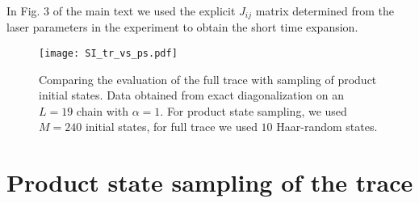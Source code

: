 \documentclass[aps,10pt,reprint,groupedaddress,superscriptaddress]{revtex4-2}
\begin{document}
In Fig. 3 of the main text we used the explicit $J_{ij}$ matrix determined from the laser parameters in the experiment to obtain the short time expansion.

\begin{figure}
     \centering
     \texttt{[image: SI\_tr\_vs\_ps.pdf]}
     \caption{Comparing the evaluation of the full trace with sampling of product initial states. Data obtained from exact diagonalization on an $L=19$ chain with $\alpha=1$. For product state sampling, we used $M=240$ initial states, for full trace we used $10$ Haar-random states.}
     \label{fig:trvsprod}
 \end{figure}
\section{Product state sampling of the trace}
\end{document}
